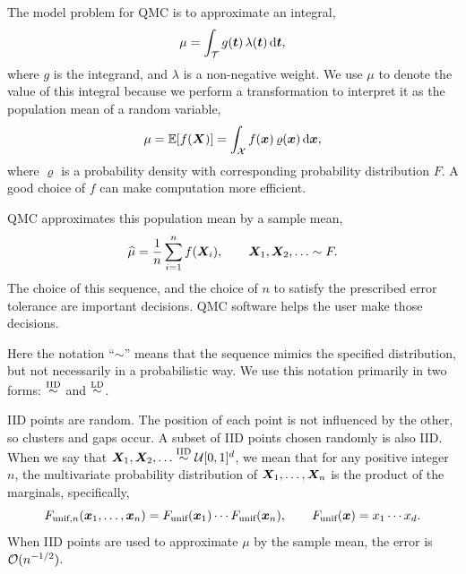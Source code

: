 \documentclass[graybox,footinfo]{svmult}
\newcommand{\hmu}{\widehat{\mu}}
\newcommand{\IID}{\textup{IID}}
\newcommand{\LD}{\textup{LD}}
\newcommand{\unif}{\textup{unif}}
\newcommand{\IIDsim}{\overset{\IID}{\sim}}
\newcommand{\LDsim}{\overset{\LD}{\sim}}
\begin{document}
The model problem for QMC is to approximate an integral,
\begin{equation} \label{eq:integral}
	\mu = \int_\calT g(\bst) \, \lambda(\bst) \, \D \bst,
\end{equation}
where $g$ is the integrand, and $\lambda$ is a non-negative weight.  We use $\mu$ to denote the value of this integral because we perform a transformation to interpret it as the population mean of a random variable, 
\begin{equation} \label{eq:fintegral}
	\mu = \bbE[f(\bsX)] = \int_\calX f(\bsx) \, \varrho(\bsx) \, \D \bsx,
\end{equation}
where $\varrho$ is a probability density with corresponding probability distribution $F$. 
A good choice of $f$ can make computation more efficient.

QMC approximates this population mean by a sample mean,
\begin{equation} \label{eq:samplemean}
	\hmu = \frac 1n \sum_{i=1}^n f(\bsX_i), \qquad \bsX_1, \bsX_2, \ldots \sim F.
\end{equation}
The choice of this sequence, and the choice of $n$ to satisfy  the prescribed error tolerance are important decisions.  QMC software helps the user make those decisions.

Here the notation ``$\sim$'' means that the sequence mimics the specified distribution, but not necessarily in a probabilistic way.  We  use this notation primarily  in two forms:  $\IIDsim$ and $\LDsim$.

IID points are random. The position of each point is not influenced by the other, so clusters and gaps occur.  A subset of IID points chosen randomly is also IID.  When we say that $\bsX_1, \bsX_2, \ldots \IIDsim \calU[0,1]^d$, we mean that for any positive integer $n$, the  multivariate probability distribution of ${\boldsymbol{X}}_1, \ldots, {\boldsymbol{X}}_n$ is the product of the marginals, specifically,
\begin{equation*}
	F_{\unif,n}(\bsx_1, \ldots, \bsx_n) = F_{\unif}(\bsx_1) \cdots  F_{\unif}(\bsx_n), \qquad F_{\unif}(\bsx) = x_1 \cdots x_d.
\end{equation*}
When IID points are used to approximate $\mu$ by the sample mean, the error is ${\mathcal{O}}(n^{-1/2})$.
\end{document}
